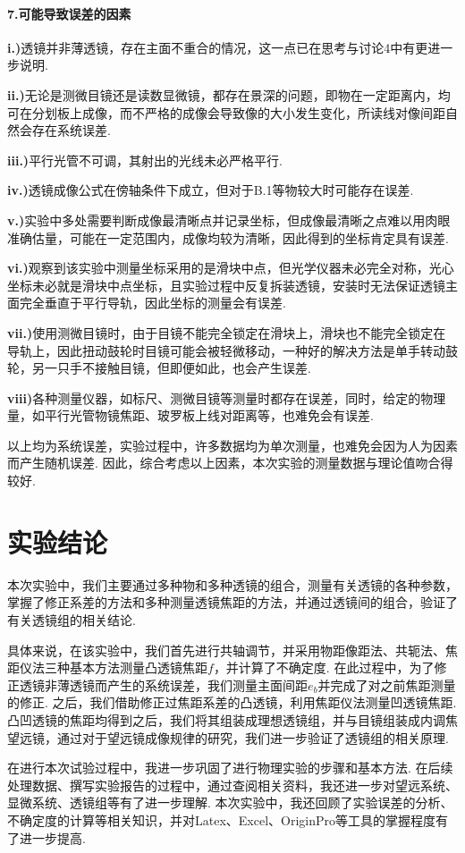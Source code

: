 \documentclass[UTF8]{ctexart}
\begin{document}
\paragraph{7.\quad 可能导致误差的因素}\quad\par
\textbf{i.)}透镜并非薄透镜，存在主面不重合的情况，这一点已在思考与讨论4中有更进一步说明.\par
\textbf{ii.)}无论是测微目镜还是读数显微镜，都存在景深的问题，即物在一定距离内，均可在分划板上成像，而不严格的成像会导致像的大小发生变化，所读线对像间距自然会存在系统误差.\par
\textbf{iii.)}平行光管不可调，其射出的光线未必严格平行.\par
\textbf{iv.)}透镜成像公式在傍轴条件下成立，但对于B.1等物较大时可能存在误差.\par
\textbf{v.)}实验中多处需要判断成像最清晰点并记录坐标，但成像最清晰之点难以用肉眼准确估量，可能在一定范围内，成像均较为清晰，因此得到的坐标肯定具有误差.\par
\textbf{vi.)}观察到该实验中测量坐标采用的是滑块中点，但光学仪器未必完全对称，光心坐标未必就是滑块中点坐标，且实验过程中反复拆装透镜，安装时无法保证透镜主面完全垂直于平行导轨，因此坐标的测量会有误差.\par
\textbf{vii.)}使用测微目镜时，由于目镜不能完全锁定在滑块上，滑块也不能完全锁定在导轨上，因此扭动鼓轮时目镜可能会被轻微移动，一种好的解决方法是单手转动鼓轮，另一只手不接触目镜，但即便如此，也会产生误差.\par
\textbf{viii)}各种测量仪器，如标尺、测微目镜等测量时都存在误差，同时，给定的物理量，如平行光管物镜焦距、玻罗板上线对距离等，也难免会有误差.\par

以上均为系统误差，实验过程中，许多数据均为单次测量，也难免会因为人为因素而产生随机误差. 因此，综合考虑以上因素，本次实验的测量数据与理论值吻合得较好.
\vspace{3em}
\section{实验结论}
本次实验中，我们主要通过多种物和多种透镜的组合，测量有关透镜的各种参数，掌握了修正系差的方法和多种测量透镜焦距的方法，并通过透镜间的组合，验证了有关透镜组的相关结论.\par
具体来说，在该实验中，我们首先进行共轴调节，并采用物距像距法、共轭法、焦距仪法三种基本方法测量凸透镜焦距$f$，并计算了不确定度. 在此过程中，为了修正透镜非薄透镜而产生的系统误差，我们测量主面间距$e_b$并完成了对之前焦距测量的修正. 之后，我们借助修正过焦距系差的凸透镜，利用焦距仪法测量凹透镜焦距. 凸凹透镜的焦距均得到之后，我们将其组装成理想透镜组，并与目镜组装成内调焦望远镜，通过对于望远镜成像规律的研究，我们进一步验证了透镜组的相关原理.\par
在进行本次试验过程中，我进一步巩固了进行物理实验的步骤和基本方法. 在后续处理数据、撰写实验报告的过程中，通过查阅相关资料，我还进一步对望远系统、显微系统、透镜组等有了进一步理解. 本次实验中，我还回顾了实验误差的分析、不确定度的计算等相关知识，并对Latex、Excel、OriginPro等工具的掌握程度有了进一步提高.
\end{document}
